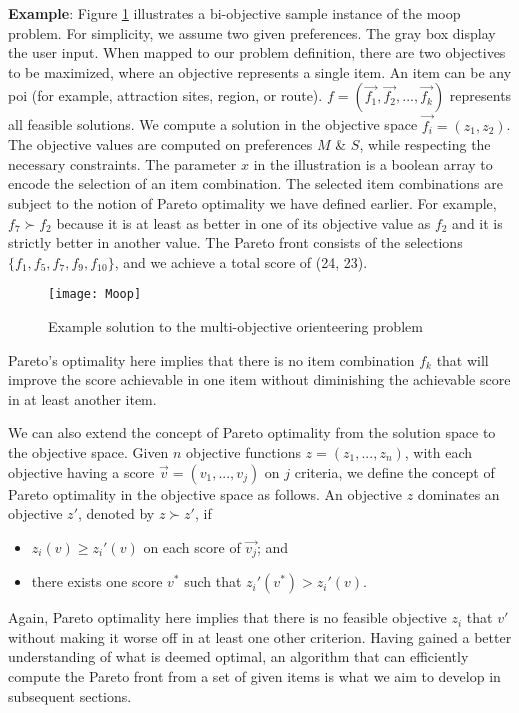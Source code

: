 \textbf{Example}:
Figure \ref{fig:moopsample} illustrates a bi-objective sample instance of the \gls{moop} problem. For simplicity, we assume two given preferences. The gray box display the user input. When mapped to our problem definition, there are two objectives to be maximized, where an objective represents a single item. An item can be any \gls{poi} (for example, attraction sites, region, or route). $f = (\Vec{f_1}, \Vec{f_2}, ... ,\Vec{f_k})$ represents all feasible solutions. We compute a solution in the objective space $\Vec{f_i} = (z_1, z_2)$. The objective values are computed on preferences $M$ \& $S$, while respecting the necessary constraints. The parameter $x$ in the illustration is a boolean array to encode the selection of an item combination. The selected item combinations are subject to the notion of Pareto optimality we have defined earlier. For example, $f_7 \succ f_2$ because it is at least as better in one of its objective value as $f_2$ and it is strictly better in another value. The Pareto front consists of the selections $\{f_1,f_5,f_7,f_9,f_{10}\}$, and we achieve a total score of (24, 23). 


\begin{figure}[ht!]
    \centering
    \texttt{[image: Moop]}
    \caption{Example solution to the multi-objective orienteering problem}
    \label{fig:moopsample}
\end{figure}

Pareto's optimality here implies that there is no item combination $f_k$ that will improve the score achievable in one item without diminishing the achievable score in at least another item. 

We can also extend the concept of Pareto optimality from the solution space to the objective space. Given $n$ objective functions $z = (z_1,...,z_n)$, with each objective having a score $\Vec{v} = (v_1,...,v_j)$ on $j$ criteria, we define the concept of Pareto optimality in the objective space as follows. An objective $z$ dominates an objective $z'$, denoted by $z \succ z'$, if
\begin{itemize}
    \item $z_i(v) \geq z_i'(v)$ on each score of $\Vec{v_j}$; and
    \item there exists one score $v^*$ such that $z_i'(v^*) > z_i'(v)$.
\end{itemize}

Again, Pareto optimality here implies that there is no feasible objective $z_i$ that $v'$ without making it worse off in at least one other criterion. \newline Having gained a better understanding of what is deemed optimal, an algorithm that can efficiently compute the Pareto front from a set of given items is what we aim to develop in subsequent sections.


